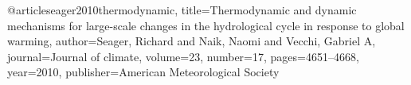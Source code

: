 @article{seager2010thermodynamic,
  title={Thermodynamic and dynamic mechanisms for large-scale changes in the hydrological cycle in response to global warming},
  author={Seager, Richard and Naik, Naomi and Vecchi, Gabriel A},
  journal={Journal of climate},
  volume={23},
  number={17},
  pages={4651--4668},
  year={2010},
  publisher={American Meteorological Society}
}